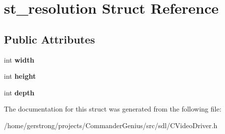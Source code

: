 \hypertarget{structst__resolution}{
\section{st\_\-resolution Struct Reference}
\label{structst__resolution}
}
\subsection*{Public Attributes}
\begin{DoxyCompactItemize}
\item 
\hypertarget{structst__resolution_a84d98fe25538c8c6cace507d66ad2710}{
int {\bfseries width}}
\label{structst__resolution_a84d98fe25538c8c6cace507d66ad2710}

\item 
\hypertarget{structst__resolution_ab8b9c67e5ce61ea6f6847bb615f9702c}{
int {\bfseries height}}
\label{structst__resolution_ab8b9c67e5ce61ea6f6847bb615f9702c}

\item 
\hypertarget{structst__resolution_af5132fb85ae62d773e9ba521c0bdf7cb}{
int {\bfseries depth}}
\label{structst__resolution_af5132fb85ae62d773e9ba521c0bdf7cb}

\end{DoxyCompactItemize}


The documentation for this struct was generated from the following file:\begin{DoxyCompactItemize}
\item 
/home/gerstrong/projects/CommanderGenius/src/sdl/CVideoDriver.h\end{DoxyCompactItemize}
